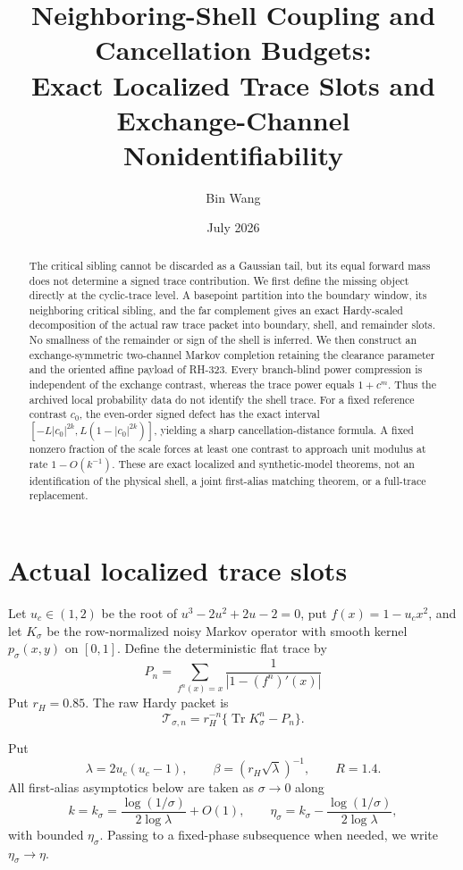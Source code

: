 \documentclass[11pt]{article}
\title{Neighboring-Shell Coupling and Cancellation Budgets:\\
Exact Localized Trace Slots and Exchange-Channel Nonidentifiability}
\author{Bin Wang}
\date{July 2026}
\theoremstyle{remark}
\newcommand{\Tr}{\operatorname{Tr}}
\newcommand{\cT}{\mathcal T}
\begin{document}
\maketitle

\begin{abstract}
The critical sibling cannot be discarded as a Gaussian tail, but its equal
forward mass does not determine a signed trace contribution.  We first
define the missing object directly at the cyclic-trace level.  A
basepoint partition into the boundary window, its neighboring critical
sibling, and the far complement gives an exact Hardy-scaled decomposition
of the actual raw trace packet into boundary, shell, and remainder slots.
No smallness of the remainder or sign of the shell is inferred.  We then
construct an exchange-symmetric two-channel Markov completion retaining the
clearance parameter and the oriented affine payload of RH-323.  Every
branch-blind power compression is independent of the exchange contrast,
whereas the trace power equals $1+c^m$.  Thus the archived local probability
data do not identify the shell trace.  For a fixed reference contrast
$c_0$, the even-order signed defect has the exact interval
$[-L|c_0|^{2k},L(1-|c_0|^{2k})]$, yielding a sharp cancellation-distance
formula.  A fixed nonzero fraction of the scale forces at least one contrast
to approach unit modulus at rate $1-O(k^{-1})$.  These are exact localized
and synthetic-model theorems, not an identification of the physical shell,
a joint first-alias matching theorem, or a full-trace replacement.
\end{abstract}

\section{Actual localized trace slots}

Let $u_c\in(1,2)$ be the root of
$u^3-2u^2+2u-2=0$, put $f(x)=1-u_cx^2$, and let $K_\sigma$ be the
row-normalized noisy Markov operator with smooth kernel $p_\sigma(x,y)$ on
$[0,1]$.  Define the deterministic flat trace by
\begin{equation}
 P_n=\sum_{f^n(x)=x}\frac1{|1-(f^n)'(x)|}
 \label{eq:flat-trace}
\end{equation}
Put $r_H=0.85$.  The raw Hardy packet is
\begin{equation}
 \cT_{\sigma,n}=r_H^{-n}\{\Tr K_\sigma^n-P_n\}.
 \label{eq:raw-packet}
\end{equation}

Put
\begin{equation}
 \lambda=2u_c(u_c-1),
 \qquad
 \beta=(r_H\sqrt\lambda)^{-1},
 \qquad
 R=1.4.
 \label{eq:route-constants}
\end{equation}
All first-alias asymptotics below are taken as $\sigma\to0$ along
\begin{equation}
 k=k_\sigma
 =\frac{\log(1/\sigma)}{2\log\lambda}+O(1),
 \qquad
 \eta_\sigma=k_\sigma-\frac{\log(1/\sigma)}{2\log\lambda},
 \label{eq:natural-clock}
\end{equation}
with bounded $\eta_\sigma$.
Passing to a fixed-phase subsequence when needed, we write
$\eta_\sigma\to\eta$.
\end{document}
